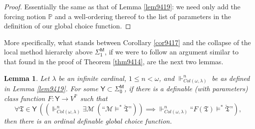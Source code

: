 \documentclass[12pt, twoside]{memoir}
\numberwithin{equation}{section}
\newtheorem{lem}[thm]{Lemma}
\theoremstyle{definition}
\theoremstyle{remark}
\theoremstyle{definition}
\theoremstyle{definition}
\theoremstyle{definition}
\theoremstyle{remark}
\begin{document}
\begin{proof}
Essentially the same as that of Lemma \ref{lem9419}: we need only add the forcing notion $\mathbb{P}$ and a well-ordering thereof to the list of parameters in the definition of our global choice function.
\end{proof}

More specifically, what stands between Corollary \ref{cor9417} and the collapse of the local method hierarchy above $\mathsf{\Sigma^M_1}$, if we were to follow an argument similar to that found in the proof of Theorem \ref{thm9414}, are the next two lemmas.

\begin{lem}\label{lem9421}
Let $\lambda$ be an infinite cardinal, $1 \leq n < \omega$, and $\Vdash^n_{Col(\omega, \lambda)}$ be as defined in Lemma \ref{lem9419}.
For some $\mathsf{Y} \subset \mathsf{\Sigma^M_0}$, if there is a definable (with parameters) class function $F : \mathsf{Y} \longrightarrow V^{\mathbb{P}}$ such that
\begin{equation}\label{eq944}
    \forall \mathfrak{T} \in \mathsf{Y} \ ((\Vdash^n_{Col(\omega, \lambda)} \exists \mathcal{M} \ (\text{``} \mathcal{M} \models^* \check{\mathfrak{T}} \text{''})) \implies \Vdash^n_{Col(\omega, \lambda)} \text{``} F(\mathfrak{T}) \models^* \check{\mathfrak{T}} \text{''}) \text{,}
\end{equation}
then there is an ordinal definable global choice function.
\end{lem}
\end{document}
